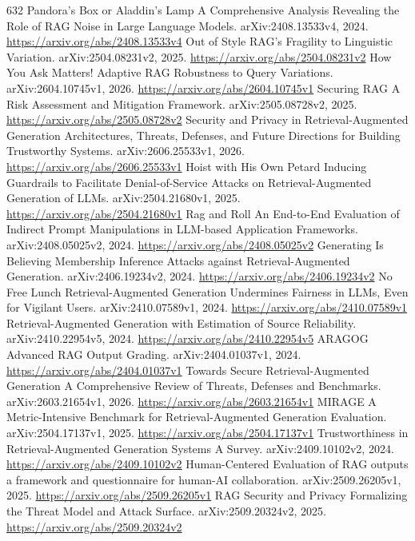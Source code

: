 \documentclass[11pt]{article}
\begin{document}
\begin{thebibliography}{632}
 Pandora's Box or Aladdin's Lamp A Comprehensive Analysis Revealing the Role of RAG Noise in Large Language Models. arXiv:2408.13533v4, 2024. \url{https://arxiv.org/abs/2408.13533v4}
 Out of Style RAG's Fragility to Linguistic Variation. arXiv:2504.08231v2, 2025. \url{https://arxiv.org/abs/2504.08231v2}
 How You Ask Matters! Adaptive RAG Robustness to Query Variations. arXiv:2604.10745v1, 2026. \url{https://arxiv.org/abs/2604.10745v1}
 Securing RAG A Risk Assessment and Mitigation Framework. arXiv:2505.08728v2, 2025. \url{https://arxiv.org/abs/2505.08728v2}
 Security and Privacy in Retrieval-Augmented Generation Architectures, Threats, Defenses, and Future Directions for Building Trustworthy Systems. arXiv:2606.25533v1, 2026. \url{https://arxiv.org/abs/2606.25533v1}
 Hoist with His Own Petard Inducing Guardrails to Facilitate Denial-of-Service Attacks on Retrieval-Augmented Generation of LLMs. arXiv:2504.21680v1, 2025. \url{https://arxiv.org/abs/2504.21680v1}
 Rag and Roll An End-to-End Evaluation of Indirect Prompt Manipulations in LLM-based Application Frameworks. arXiv:2408.05025v2, 2024. \url{https://arxiv.org/abs/2408.05025v2}
 Generating Is Believing Membership Inference Attacks against Retrieval-Augmented Generation. arXiv:2406.19234v2, 2024. \url{https://arxiv.org/abs/2406.19234v2}
 No Free Lunch Retrieval-Augmented Generation Undermines Fairness in LLMs, Even for Vigilant Users. arXiv:2410.07589v1, 2024. \url{https://arxiv.org/abs/2410.07589v1}
 Retrieval-Augmented Generation with Estimation of Source Reliability. arXiv:2410.22954v5, 2024. \url{https://arxiv.org/abs/2410.22954v5}
 ARAGOG Advanced RAG Output Grading. arXiv:2404.01037v1, 2024. \url{https://arxiv.org/abs/2404.01037v1}
 Towards Secure Retrieval-Augmented Generation A Comprehensive Review of Threats, Defenses and Benchmarks. arXiv:2603.21654v1, 2026. \url{https://arxiv.org/abs/2603.21654v1}
 MIRAGE A Metric-Intensive Benchmark for Retrieval-Augmented Generation Evaluation. arXiv:2504.17137v1, 2025. \url{https://arxiv.org/abs/2504.17137v1}
 Trustworthiness in Retrieval-Augmented Generation Systems A Survey. arXiv:2409.10102v2, 2024. \url{https://arxiv.org/abs/2409.10102v2}
 Human-Centered Evaluation of RAG outputs a framework and questionnaire for human-AI collaboration. arXiv:2509.26205v1, 2025. \url{https://arxiv.org/abs/2509.26205v1}
 RAG Security and Privacy Formalizing the Threat Model and Attack Surface. arXiv:2509.20324v2, 2025. \url{https://arxiv.org/abs/2509.20324v2}

\end{thebibliography}
\end{document}
